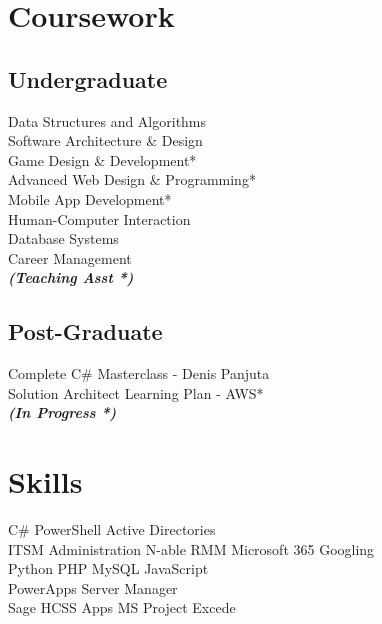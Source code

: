 \documentclass[]{pratham-resume-openfont}
\begin{document}
\begin{minipage}[t]{0.34\textwidth}
\section{Coursework}
\subsection{Undergraduate}
Data Structures and Algorithms \\
Software Architecture \& Design\\
Game Design \& Development* \\
Advanced Web Design \& Programming* \\
Mobile App Development* \\
Human-Computer Interaction \\
Database Systems \\
Career Management \\
{\footnotesize \textit{\textbf{(Teaching Asst *) }}} \\

\sectionsep
\subsection{Post-Graduate}
Complete C\# Masterclass - Denis Panjuta \\
Solution Architect Learning Plan - AWS* \\
{\footnotesize \textit{\textbf{(In Progress *) }}} \\


\section{Skills}
C\# \textbullet{} PowerShell \textbullet{} Active Directories \\
 \textbullet{} ITSM Administration \textbullet{} N-able RMM 
 \textbullet{} Microsoft 365 \textbullet{} Googling \\ 
Python \textbullet{} PHP \textbullet{} MySQL \textbullet{} JavaScript \\ \textbullet{} PowerApps \textbullet{} Server Manager \\
Sage \textbullet{} HCSS Apps \textbullet{} MS Project \textbullet{} Excede
\sectionsep

%
%

\end{minipage} 
\end{document}
